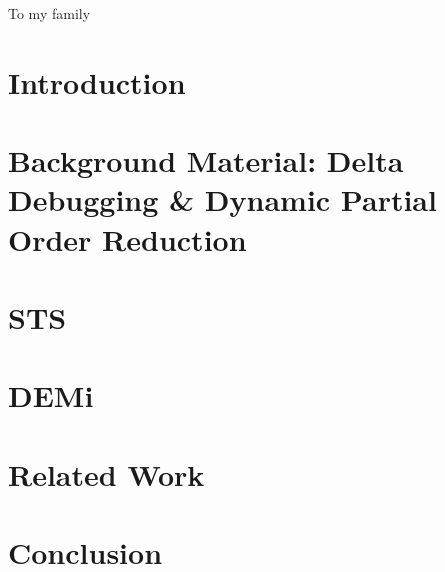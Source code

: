 

\begin{abstract}

\end{abstract}

\begin{frontmatter}

\begin{dedication}
\null\vfil
{\large
\begin{center}
To my family
\end{center}}
\null\vfil
\end{dedication}

\tableofcontents
\listoffigures %
\listoftables %



\end{frontmatter}

\chapter{Introduction}
\label{sec:intro}


\chapter{Background Material: Delta Debugging \& Dynamic Partial Order
Reduction}
\label{sec:background_material}


\chapter{STS}
\label{sec:sts}


\chapter{DEMi}
\label{sec:demi}


\chapter{Related Work}
\label{sec:related_work}


\chapter{Conclusion}
\label{main_sec:conclusion}


%

%


\printbibliography


